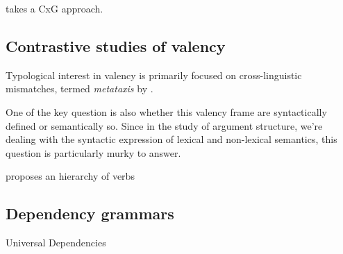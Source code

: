 \citet{croft2012} takes a CxG approach. 


\subsection{Contrastive studies of valency}


Typological interest in valency is primarily focused on cross-linguistic mismatches, termed \textit{metataxis} by \citet{tesniere1959}.

One of the key question is also whether this valency frame are syntactically defined or semantically so. Since in the study of argument structure, we're dealing with the syntactic expression of lexical and non-lexical semantics, this question is particularly murky to answer.

\citet{tsunoda1981, tsunoda1985} proposes an hierarchy of verbs



\subsection{Dependency grammars}

Universal Dependencies 



